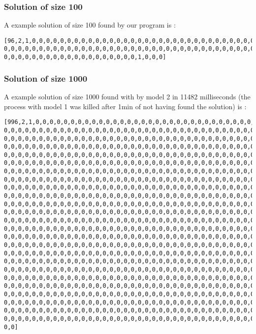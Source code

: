 \documentclass{eplDoc}
\begin{document}
\subsubsection{Solution of size 100}
A example solution of size 100 found by our program is : \\ 

\begin{lstlisting}
[96,2,1,0,0,0,0,0,0,0,0,0,0,0,0,0,0,0,0,0,0,0,0,0,0,0,0,0,0,0,0,0,0,0,0,0,0,0, 0,0,0,0,0,0,0,0,0,0,0,0,0,0,0,0,0,0,0,0,0,0,0,0,0,0,0,0,0,0,0,0,0,0,0,0,0,0,0, 0,0,0,0,0,0,0,0,0,0,0,0,0,0,0,0,0,0,0,1,0,0,0]
\end{lstlisting}
\subsubsection{Solution of size 1000}
A example solution of size 1000 found with by model 2 in 11482 milliseconds (the process with model 1 was killed after 1min of not having found the solution) is : \\
\begin{lstlisting}
[996,2,1,0,0,0,0,0,0,0,0,0,0,0,0,0,0,0,0,0,0,0,0,0,0,0,0,0,0,0,0,0,0,0,0,0,0,0, 0,0,0,0,0,0,0,0,0,0,0,0,0,0,0,0,0,0,0,0,0,0,0,0,0,0,0,0,0,0,0,0,0,0,0,0,0,0,0,0, 0,0,0,0,0,0,0,0,0,0,0,0,0,0,0,0,0,0,0,0,0,0,0,0,0,0,0,0,0,0,0,0,0,0,0,0,0,0,0,0, 0,0,0,0,0,0,0,0,0,0,0,0,0,0,0,0,0,0,0,0,0,0,0,0,0,0,0,0,0,0,0,0,0,0,0,0,0,0,0,0, 0,0,0,0,0,0,0,0,0,0,0,0,0,0,0,0,0,0,0,0,0,0,0,0,0,0,0,0,0,0,0,0,0,0,0,0,0,0,0,0, 0,0,0,0,0,0,0,0,0,0,0,0,0,0,0,0,0,0,0,0,0,0,0,0,0,0,0,0,0,0,0,0,0,0,0,0,0,0,0,0, 0,0,0,0,0,0,0,0,0,0,0,0,0,0,0,0,0,0,0,0,0,0,0,0,0,0,0,0,0,0,0,0,0,0,0,0,0,0,0,0, 0,0,0,0,0,0,0,0,0,0,0,0,0,0,0,0,0,0,0,0,0,0,0,0,0,0,0,0,0,0,0,0,0,0,0,0,0,0,0,0, 0,0,0,0,0,0,0,0,0,0,0,0,0,0,0,0,0,0,0,0,0,0,0,0,0,0,0,0,0,0,0,0,0,0,0,0,0,0,0,0, 0,0,0,0,0,0,0,0,0,0,0,0,0,0,0,0,0,0,0,0,0,0,0,0,0,0,0,0,0,0,0,0,0,0,0,0,0,0,0,0, 0,0,0,0,0,0,0,0,0,0,0,0,0,0,0,0,0,0,0,0,0,0,0,0,0,0,0,0,0,0,0,0,0,0,0,0,0,0,0,0, 0,0,0,0,0,0,0,0,0,0,0,0,0,0,0,0,0,0,0,0,0,0,0,0,0,0,0,0,0,0,0,0,0,0,0,0,0,0,0,0, 0,0,0,0,0,0,0,0,0,0,0,0,0,0,0,0,0,0,0,0,0,0,0,0,0,0,0,0,0,0,0,0,0,0,0,0,0,0,0,0, 0,0,0,0,0,0,0,0,0,0,0,0,0,0,0,0,0,0,0,0,0,0,0,0,0,0,0,0,0,0,0,0,0,0,0,0,0,0,0,0, 0,0,0,0,0,0,0,0,0,0,0,0,0,0,0,0,0,0,0,0,0,0,0,0,0,0,0,0,0,0,0,0,0,0,0,0,0,0,0,0, 0,0,0,0,0,0,0,0,0,0,0,0,0,0,0,0,0,0,0,0,0,0,0,0,0,0,0,0,0,0,0,0,0,0,0,0,0,0,0,0, 0,0,0,0,0,0,0,0,0,0,0,0,0,0,0,0,0,0,0,0,0,0,0,0,0,0,0,0,0,0,0,0,0,0,0,0,0,0,0,0, 0,0,0,0,0,0,0,0,0,0,0,0,0,0,0,0,0,0,0,0,0,0,0,0,0,0,0,0,0,0,0,0,0,0,0,0,0,0,0,0, 0,0,0,0,0,0,0,0,0,0,0,0,0,0,0,0,0,0,0,0,0,0,0,0,0,0,0,0,0,0,0,0,0,0,0,0,0,0,0,0, 0,0,0,0,0,0,0,0,0,0,0,0,0,0,0,0,0,0,0,0,0,0,0,0,0,0,0,0,0,0,0,0,0,0,0,0,0,0,0,0, 0,0,0,0,0,0,0,0,0,0,0,0,0,0,0,0,0,0,0,0,0,0,0,0,0,0,0,0,0,0,0,0,0,0,0,0,0,0,0,0, 0,0,0,0,0,0,0,0,0,0,0,0,0,0,0,0,0,0,0,0,0,0,0,0,0,0,0,0,0,0,0,0,0,0,0,0,0,0,0,0, 0,0,0,0,0,0,0,0,0,0,0,0,0,0,0,0,0,0,0,0,0,0,0,0,0,0,0,0,0,0,0,0,0,0,0,0,0,0,0,0, 0,0,0,0,0,0,0,0,0,0,0,0,0,0,0,0,0,0,0,0,0,0,0,0,0,0,0,0,0,0,0,0,0,0,0,0,0,0,0,0, 0,0,0,0,0,0,0,0,0,0,0,0,0,0,0,0,0,0,0,0,0,0,0,0,0,0,0,0,0,0,0,0,0,0,0,0,0,0,1,0, 0,0]
\end{lstlisting}
\end{document}
